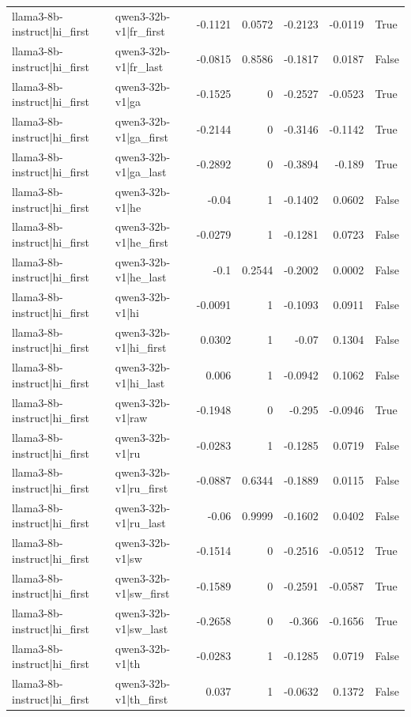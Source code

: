 \begin{table}
\begin{tabular}{l l r r r r l}
llama3-8b-instruct|hi_first & qwen3-32b-v1|fr_first & -0.1121 & 0.0572 & -0.2123 & -0.0119 & True \\
llama3-8b-instruct|hi_first & qwen3-32b-v1|fr_last & -0.0815 & 0.8586 & -0.1817 & 0.0187 & False \\
llama3-8b-instruct|hi_first & qwen3-32b-v1|ga & -0.1525 & 0 & -0.2527 & -0.0523 & True \\
llama3-8b-instruct|hi_first & qwen3-32b-v1|ga_first & -0.2144 & 0 & -0.3146 & -0.1142 & True \\
llama3-8b-instruct|hi_first & qwen3-32b-v1|ga_last & -0.2892 & 0 & -0.3894 & -0.189 & True \\
llama3-8b-instruct|hi_first & qwen3-32b-v1|he & -0.04 & 1 & -0.1402 & 0.0602 & False \\
llama3-8b-instruct|hi_first & qwen3-32b-v1|he_first & -0.0279 & 1 & -0.1281 & 0.0723 & False \\
llama3-8b-instruct|hi_first & qwen3-32b-v1|he_last & -0.1 & 0.2544 & -0.2002 & 0.0002 & False \\
llama3-8b-instruct|hi_first & qwen3-32b-v1|hi & -0.0091 & 1 & -0.1093 & 0.0911 & False \\
llama3-8b-instruct|hi_first & qwen3-32b-v1|hi_first & 0.0302 & 1 & -0.07 & 0.1304 & False \\
llama3-8b-instruct|hi_first & qwen3-32b-v1|hi_last & 0.006 & 1 & -0.0942 & 0.1062 & False \\
llama3-8b-instruct|hi_first & qwen3-32b-v1|raw & -0.1948 & 0 & -0.295 & -0.0946 & True \\
llama3-8b-instruct|hi_first & qwen3-32b-v1|ru & -0.0283 & 1 & -0.1285 & 0.0719 & False \\
llama3-8b-instruct|hi_first & qwen3-32b-v1|ru_first & -0.0887 & 0.6344 & -0.1889 & 0.0115 & False \\
llama3-8b-instruct|hi_first & qwen3-32b-v1|ru_last & -0.06 & 0.9999 & -0.1602 & 0.0402 & False \\
llama3-8b-instruct|hi_first & qwen3-32b-v1|sw & -0.1514 & 0 & -0.2516 & -0.0512 & True \\
llama3-8b-instruct|hi_first & qwen3-32b-v1|sw_first & -0.1589 & 0 & -0.2591 & -0.0587 & True \\
llama3-8b-instruct|hi_first & qwen3-32b-v1|sw_last & -0.2658 & 0 & -0.366 & -0.1656 & True \\
llama3-8b-instruct|hi_first & qwen3-32b-v1|th & -0.0283 & 1 & -0.1285 & 0.0719 & False \\
llama3-8b-instruct|hi_first & qwen3-32b-v1|th_first & 0.037 & 1 & -0.0632 & 0.1372 & False \\

\end{tabular}
\end{table}
